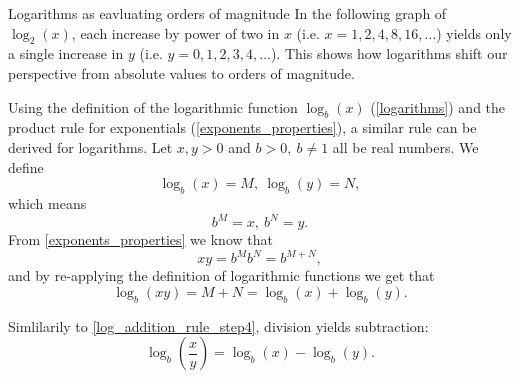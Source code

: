 \begin{example}{Logarithms as eavluating orders of magnitude}{}
	In the following graph of $\log_{2}(x)$, each increase by power of two in $x$ (i.e. $x=1,2,4,8,16,\dots$) yields only a single increase in $y$ (i.e. $y=0,1,2,3,4,\dots$). This shows how logarithms shift our perspective from absolute values to orders of magnitude.
	\begin{figure}[H]
		\centering
	\end{figure}
\end{example}

Using the definition of the logarithmic function $\log_{b}(x)$ (\eqref{logarithms}) and the product rule for exponentials (\eqref{exponents_properties}), a similar rule can be derived for logarithms. Let $x,y>0$ and $b>0,\ b\neq1$ all be real numbers. We define
\begin{equation}
	\log_{b}(x)=M,\ \log_{b}(y)=N,
	\label{eq:log_addition_rule_step1}
\end{equation}
which means
\begin{equation}
	b^{M}=x,\ b^{N}=y.
	\label{eq:log_addition_rule_step2}
\end{equation}
From \eqref{exponents_properties} we know that
\begin{equation}
	xy = b^{M}b^{N} = b^{M+N},
	\label{eq:log_addition_rule_step3}
\end{equation}
and by re-applying the definition of logarithmic functions we get that
\begin{equation}
	\log_{b}(xy) = M+N = \log_{b}(x) + \log_{b}(y).
	\label{eq:log_addition_rule_step4}
\end{equation}

Simlilarily to \eqref{log_addition_rule_step4}, division yields subtraction:
\begin{equation}
	\log_{b}\left(\frac{x}{y}\right) = \log_{b}(x)-\log_{b}(y).
	\label{eq:log_subtraction_rule}
\end{equation}


